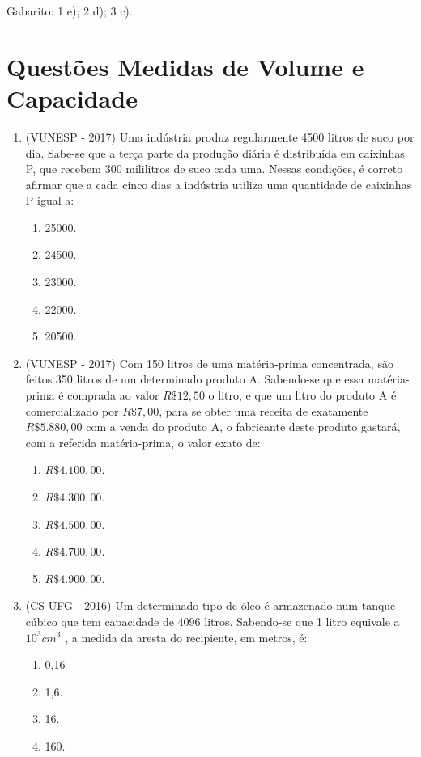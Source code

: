 Gabarito: 1 e); 2 d); 3 c).


\section{Questões Medidas de Volume e Capacidade}

\begin{enumerate}[1)]
 \item (VUNESP - 2017) Uma indústria produz regularmente 4500 litros de suco por dia. Sabe-se que a terça parte da produção diária é distribuída em caixinhas P, que recebem 300 mililitros de suco cada uma. Nessas condições, é correto afirmar que a cada cinco dias a indústria utiliza uma quantidade de caixinhas P igual a:
 \begin{enumerate}
 \item 25000.
 \item 24500.
 \item 23000.
 \item 22000.
 \item 20500.
 \end{enumerate}

 \item (VUNESP - 2017) Com 150 litros de uma matéria-prima concentrada, são feitos 350 litros de um determinado produto A. Sabendo-se que essa matéria-prima é comprada ao valor $R\$ 12,50$ o litro, e que um litro do produto A é comercializado por $R\$ 7,00$, para se obter uma receita de exatamente $R\$ 5.880,00$ com a venda do produto A, o fabricante deste produto gastará, com a referida matéria­-prima, o valor exato de:
 \begin{enumerate}
 \item $R\$ 4.100,00$.
 \item $R\$ 4.300,00$.
 \item $R\$ 4.500,00$.
 \item $R\$ 4.700,00$.
 \item $R\$ 4.900,00$.
 \end{enumerate}

 \item (CS-UFG - 2016) Um determinado tipo de óleo é armazenado num tanque cúbico que tem capacidade de $4 096$ litros. Sabendo-se que 1 litro equivale a $10^3 cm^3$ , a medida da aresta do recipiente, em metros, é:
\begin{enumerate}
 \item 0,16
 \item 1,6.
 \item 16.
 \item 160.
\end{enumerate}


\end{enumerate}
